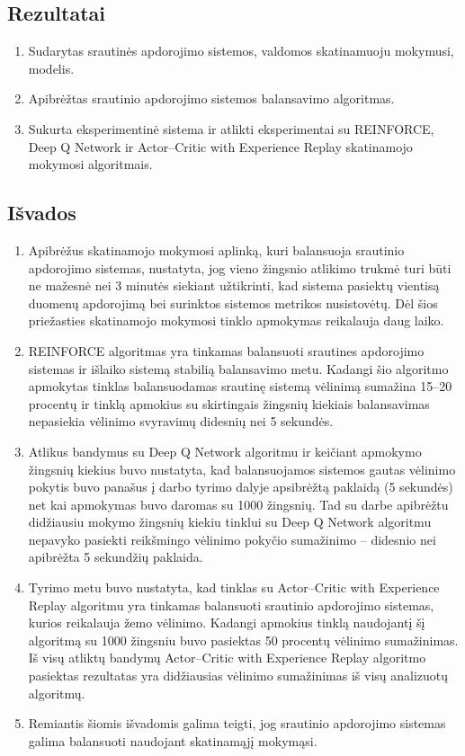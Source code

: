\documentclass{VUMIFPSbakalaurinis}
\begin{document}
\subsection*{Rezultatai}
\begin{enumerate}
    \item Sudarytas srautinės apdorojimo sistemos, valdomos skatinamuoju mokymusi, modelis.
    \item Apibrėžtas srautinio apdorojimo sistemos balansavimo algoritmas.
    \item Sukurta eksperimentinė sistema ir atlikti eksperimentai su REINFORCE, Deep Q Network ir Actor–Critic with Experience Replay skatinamojo mokymosi algoritmais.
\end{enumerate}

\subsection*{Išvados}

\begin{enumerate}
    \item Apibrėžus skatinamojo mokymosi aplinką, kuri balansuoja srautinio apdorojimo sistemas, nustatyta, jog vieno žingsnio atlikimo trukmė turi būti ne mažesnė nei 3 minutės siekiant užtikrinti, kad sistema pasiektų vientisą duomenų apdorojimą bei surinktos sistemos metrikos nusistovėtų. Dėl šios priežasties skatinamojo mokymosi tinklo apmokymas reikalauja daug laiko.
    \item REINFORCE algoritmas yra tinkamas balansuoti srautines apdorojimo sistemas ir išlaiko sistemą stabilią balansavimo metu. Kadangi šio algoritmo apmokytas tinklas balansuodamas srautinę sistemą vėlinimą sumažina 15–20 procentų ir tinklą apmokius su skirtingais žingsnių kiekiais balansavimas nepasiekia vėlinimo svyravimų didesnių nei 5 sekundės. 
    \item Atlikus bandymus su Deep Q Network algoritmu ir keičiant apmokymo žingsnių kiekius buvo nustatyta, kad balansuojamos sistemos gautas vėlinimo pokytis buvo panašus į darbo tyrimo dalyje apsibrėžtą paklaidą (5 sekundės) net kai apmokymas buvo daromas su 1000 žingsnių. Tad su darbe apibrėžtu didžiausiu mokymo žingsnių kiekiu tinklui su Deep Q Network algoritmu nepavyko pasiekti reikšmingo vėlinimo pokyčio sumažinimo – didesnio nei apibrėžta 5 sekundžių paklaida. 
    \item Tyrimo metu buvo nustatyta, kad tinklas su Actor–Critic with Experience Replay algoritmu yra tinkamas balansuoti srautinio apdorojimo sistemas, kurios reikalauja žemo vėlinimo. Kadangi apmokius tinklą naudojantį šį algoritmą su 1000 žingsniu buvo pasiektas 50 procentų vėlinimo sumažinimas. Iš visų atliktų bandymų Actor–Critic with Experience Replay algoritmo pasiektas rezultatas yra didžiausias vėlinimo sumažinimas iš visų analizuotų algoritmų.
    \item Remiantis šiomis išvadomis galima teigti, jog srautinio apdorojimo sistemas galima balansuoti naudojant skatinamąjį mokymąsi.
\end{enumerate}
\end{document}
